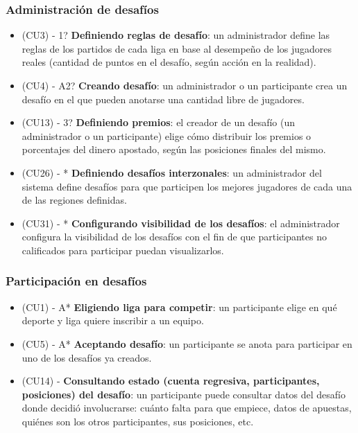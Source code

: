 \subsubsection{Administración de desafíos}
\begin{itemize}
\item (CU3) - 1? \textbf{Definiendo reglas de desafío}: un administrador define las reglas de los partidos de cada liga en base al desempeño de los jugadores reales (cantidad de puntos en el desafío, según acción en la realidad).
\item (CU4) - A2? \textbf{Creando desafío}: un administrador o un participante crea un desafío en el que pueden anotarse una cantidad libre de jugadores.
\item (CU13) - 3? \textbf{Definiendo premios}: el creador de un desafío (un administrador o un participante) elige cómo distribuir los premios o porcentajes del dinero apostado, según las posiciones finales del mismo.
\item (CU26) - * \textbf{Definiendo desafíos interzonales}: un administrador del sistema define desafíos para que participen los mejores jugadores de cada una de las regiones definidas.
\item (CU31) - * \textbf{Configurando visibilidad de los desafíos}: el administrador configura la visibilidad de los desafíos con el fin de que participantes no calificados para participar puedan visualizarlos.
\end{itemize}

\subsubsection{Participación en desafíos}

\begin{itemize}
\item (CU1) - A* \textbf{Eligiendo liga para competir}: un participante elige en qué deporte y liga quiere inscribir a un equipo.
\item (CU5) - A* \textbf{Aceptando desafío}: un participante se anota para participar en uno de los desafíos ya creados.
\item (CU14) - \textbf{Consultando estado (cuenta regresiva, participantes, posiciones) del desafío}: un participante puede consultar datos del desafío donde decidió involucrarse: cuánto falta para que empiece, datos de apuestas, quiénes son los otros participantes, sus posiciones, etc.
\end{itemize}



